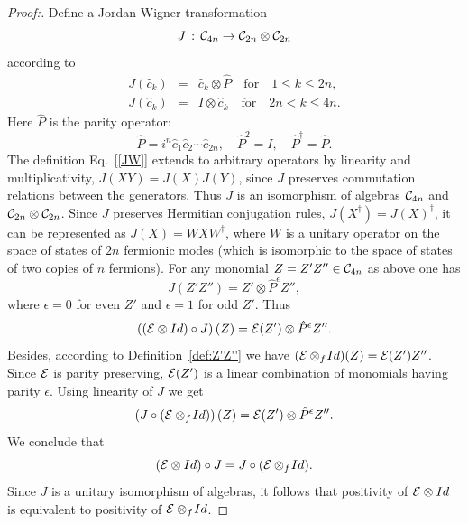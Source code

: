 \documentclass[twocolumn,showpacs,preprintnumbers,superscriptaddress]{revtex4}
\newcommand{\calE}{{\cal E }}
\newcommand{\Clif}{{\cal C}}
\newcommand{\ep}{\epsilon}
\newcommand{\nn}{\nonumber}
\newcommand{\cop}{{\hat{c}}}
\newcommand{\Pop}{{\hat{P}}}
\begin{document}
\begin{proof}[Proof:]
Define a Jordan-Wigner transformation
\[
J\, : \, \Clif_{4n}\to \Clif_{2n}\otimes \Clif_{2n}
\]
according to 
\begin{eqnarray}\label{JW}
J(\cop_k)&=&\cop_k\otimes \Pop \quad \mbox{for} \quad 1\le k\le 2n,\\ \nn
J(\cop_k)&=&I\otimes \cop_k \quad \mbox{for} \quad 2n<k\le 4n.\nn
\end{eqnarray}
Here $\Pop$ is the parity operator:
\[
\Pop=i^n \cop_1\cop_2\cdots \cop_{2n}, \quad \Pop^2=I, \quad \Pop^\dag=\Pop.
\]
The definition Eq.~[\ref{JW}] extends to arbitrary operators
by linearity and multiplicativity, $J(XY)=J(X)J(Y)$,
since $J$ preserves commutation relations between the generators.
Thus $J$ is an isomorphism of 
algebras $\Clif_{4n}$ and $\Clif_{2n}\otimes \Clif_{2n}$. Since $J$
preserves  Hermitian conjugation rules, $J(X^\dag)=J(X)^\dag$,
it can be represented as $J(X)=WXW^\dag$, where $W$
is a unitary operator on the space of states of $2n$ fermionic modes
(which is isomorphic to the space of states of two copies of $n$ fermions).
For any monomial $Z=Z'Z''\in \Clif_{4n}$ as above one has
\[
J(Z'Z'')=Z'\otimes \Pop^\ep Z'',
\]
where $\ep=0$ for even $Z'$ and $\ep=1$ for odd $Z'$. Thus
\[
\left((\calE\otimes Id)\circ J \right)(Z)=\calE(Z')\otimes \Pop^\ep Z''.
\]
Besides, according to Definition~\ref{def:Z'Z''} we have
 $(\calE\otimes_f\! Id)(Z)=\calE(Z')Z''$.
Since $\calE$ is parity preserving, $\calE(Z')$ is a linear combination of
monomials having parity $\ep$. Using linearity of $J$ we get
\[
\left(J\circ (\calE\otimes_f\! Id)\right)(Z)=\calE(Z')\otimes \Pop^\ep Z''.
\]
We conclude that
\[
(\calE\otimes Id) \circ J = J\circ (\calE\otimes_f\! Id).
\]
Since $J$ is a unitary isomorphism of algebras, it follows that
positivity of $\calE\otimes Id$ is equivalent to positivity
of $\calE\otimes_f \! Id$.
\end{proof}
\end{document}
